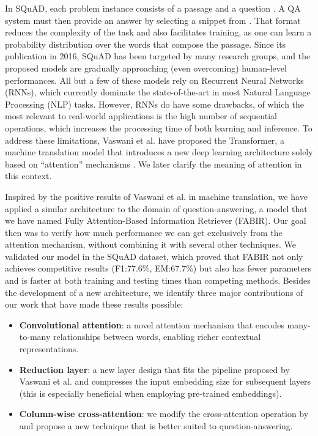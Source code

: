 \documentclass[conference, letterpaper, 10pt]{IEEEtran}
\begin{document}
In SQuAD, each problem instance consists of a passage  and a question . A QA system must then provide an answer  by selecting a snippet from . That format reduces the complexity of the task and also facilitates training, as one can learn a probability distribution over the words that compose the passage.
Since its publication in 2016, SQuAD has been targeted by many research groups, and the proposed models are gradually approaching (even overcoming) human-level performances.
All but a few of these models rely on Recurrent Neural Networks (RNNs), which currently dominate the state-of-the-art in most Natural Language Processing (NLP) tasks. However, RNNs do have some drawbacks, of which the most relevant to real-world applications is the high number of sequential operations, which increases the processing time of both learning and inference. 
To address these limitations, Vaswani et al. have proposed the Transformer, a machine translation model that introduces a new deep learning architecture solely based on ``attention'' mechanisms \cite{Vaswani}. We later clarify the meaning of attention in this context.

Inspired by the positive results of Vaswani et al. in machine translation, we have applied a similar architecture to the domain of question-answering, a model that we have named Fully Attention-Based Information Retriever (FABIR). Our goal then was to verify how much performance we can get exclusively from the attention mechanism, without combining it with several other techniques. We validated our model in the SQuAD dataset, which proved that FABIR not only achieves competitive results (F1:77.6\%, EM:67.7\%) but also has fewer parameters and is faster at both training and testing times than competing methods. Besides the development of a new architecture, we identify three major contributions of our work that have made these results possible:
\begin{itemize}
    \vspace{-\topsep}
\item \textbf{Convolutional attention}: a novel attention mechanism that encodes many-to-many relationships between words, enabling richer contextual representations.
    \item \textbf{Reduction layer}: a new layer design that fits the pipeline proposed by Vaswani et al. \cite{Vaswani} and compresses the input embedding size for subsequent layers (this is especially beneficial when employing pre-trained embeddings).
    \item \textbf{Column-wise cross-attention}: we modify the cross-attention operation by \cite{Vaswani} and propose a new technique that is better suited to question-answering.
    \vspace{-\topsep}
\end{itemize}
\end{document}
